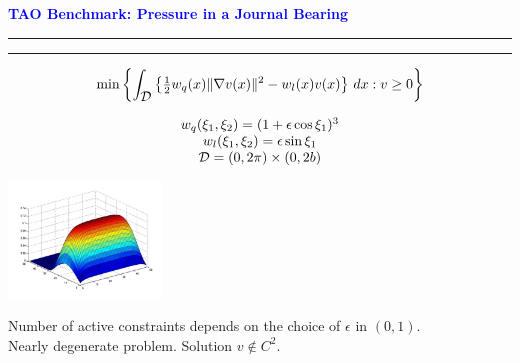 \documentclass{seminar}
\newcommand{\grad}{\nabla}
\newcommand{\half}{{\textstyle{\frac{1}{2}}}}
\newcommand{\redstripe}{\textcolor{red}{\hrule height 2.0pt\hfil}
             \vspace{-1.8pt}
             \textcolor{red}{\hrule height 1.0pt\hfil}
}
\newcommand{\heading}[1]{%
   \centerline{\textcolor{blue}{\textbf{#1}}}%
    \redstripe%
    \bigskip
}
\newcommand{\cD} {\mbox{$\cal D$}}
\begin{document}
\begin{slide}

\heading{TAO Benchmark: Pressure in a Journal Bearing}

\[
\min 
\left \{
\int_{ \cD } \left \{ \half  w_q (x) \| \grad v (x) \| ^ 2  -
  w_l (x) v (x) \right \} \, d x : v \ge 0
\right \}
\]
%
\begin{minipage}[b]{.45\linewidth}
\[
\begin{array}{c}
 w_q ( \xi_1 , \xi_2 ) = ( 1 + \epsilon \cos \xi_1 ) ^ 3  \\
 w_l ( \xi_1 , \xi_2 ) = \epsilon \sin \xi_1 \\
 \cD = ( 0 , 2 \pi ) \times ( 0 , 2b ) 
\end{array}
\]
\vspace{0.5em}
\end{minipage} \hfil
\begin{minipage}[b]{.45\linewidth}
\ifpdf
\includegraphics[height=1.2in]{../images/pjb5050}
\else
\fi
\end{minipage}

\medskip

Number of active constraints depends on the choice of 
$ \epsilon $ in $ (0,1) $.  \\
Nearly degenerate problem. Solution $ v \notin C^2 $.

\vfill

\end{slide}
\end{document}
